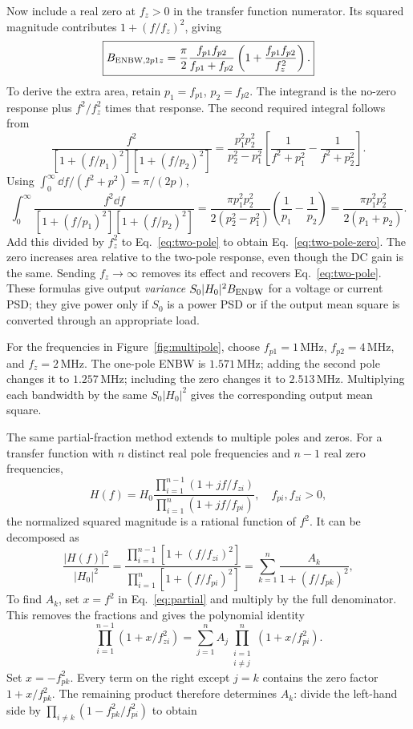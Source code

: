 Now include a real zero at $f_z>0$ in the transfer function numerator. Its squared magnitude contributes $1+(f/f_z)^2$, giving
\begin{equation}
\boxed{B_{\mathrm{ENBW},2p1z}=\frac{\pi}{2}
\frac{f_{p1}f_{p2}}{f_{p1}+f_{p2}}
\left(1+\frac{f_{p1}f_{p2}}{f_z^2}\right).}\label{eq:two-pole-zero}
\end{equation}
To derive the extra area, retain $p_1=f_{p1}$, $p_2=f_{p2}$. The integrand is the no-zero response plus $f^2/f_z^2$ times that response. The second required integral follows from
\[
\frac{f^2}{[1+(f/p_1)^2][1+(f/p_2)^2]}
=\frac{p_1^2p_2^2}{p_2^2-p_1^2}
\left[\frac1{f^2+p_1^2}-\frac1{f^2+p_2^2}\right].
\]
Using $\int_0^\infty\dd f/(f^2+p^2)=\pi/(2p)$,
\[
\int_0^\infty\frac{f^2\dd f}{[1+(f/p_1)^2][1+(f/p_2)^2]}
=\frac{\pi p_1^2p_2^2}{2(p_2^2-p_1^2)}\left(\frac1{p_1}-\frac1{p_2}\right)
=\frac{\pi p_1^2p_2^2}{2(p_1+p_2)}.
\]
Add this divided by $f_z^2$ to Eq.~\eqref{eq:two-pole} to obtain Eq.~\eqref{eq:two-pole-zero}.
The zero increases area relative to the two-pole response, even though the DC gain is the same. Sending $f_z\to\infty$ removes its effect and recovers Eq.~\eqref{eq:two-pole}. These formulas give output \emph{variance} $S_0|H_0|^2B_{\mathrm{ENBW}}$ for a voltage or current PSD; they give power only if $S_0$ is a power PSD or if the output mean square is converted through an appropriate load.

For the frequencies in Figure~\ref{fig:multipole}, choose $f_{p1}=1\,\mathrm{MHz}$, $f_{p2}=4\,\mathrm{MHz}$, and $f_z=2\,\mathrm{MHz}$. The one-pole ENBW is $1.571\,\mathrm{MHz}$; adding the second pole changes it to $1.257\,\mathrm{MHz}$; including the zero changes it to $2.513\,\mathrm{MHz}$. Multiplying each bandwidth by the same $S_0|H_0|^2$ gives the corresponding output mean square. 

The same partial-fraction method extends to multiple poles and zeros. For a transfer function with $n$ distinct real pole frequencies and $n-1$ real zero frequencies,
\[
H(f)=H_0\frac{\prod_{i=1}^{n-1}(1+jf/f_{zi})}
                 {\prod_{i=1}^{n}(1+jf/f_{pi})},
\quad f_{pi},f_{zi}>0,
\]
the normalized squared magnitude is a rational function of $f^2$. It can be decomposed as
\begin{equation}
\frac{|H(f)|^2}{|H_0|^2}
=\frac{\prod_{i=1}^{n-1}[1+(f/f_{zi})^2]}
       {\prod_{i=1}^{n}[1+(f/f_{pi})^2]}
=\sum_{k=1}^{n}\frac{A_k}{1+(f/f_{pk})^2},\label{eq:partial}
\end{equation}
To find $A_k$, set $x=f^2$ in Eq.~\eqref{eq:partial} and multiply by the full denominator. This removes the fractions and gives the polynomial identity
\[
\prod_{i=1}^{n-1}(1+x/f_{zi}^2)
=\sum_{j=1}^{n}A_j\prod_{\substack{i=1\\i\ne j}}^{n}(1+x/f_{pi}^2).
\]
Set $x=-f_{pk}^2$. Every term on the right except $j=k$ contains the zero factor $1+x/f_{pk}^2$. The remaining product therefore determines $A_k$: divide the left-hand side by $\prod_{i\ne k}(1-f_{pk}^2/f_{pi}^2)$ to obtain

